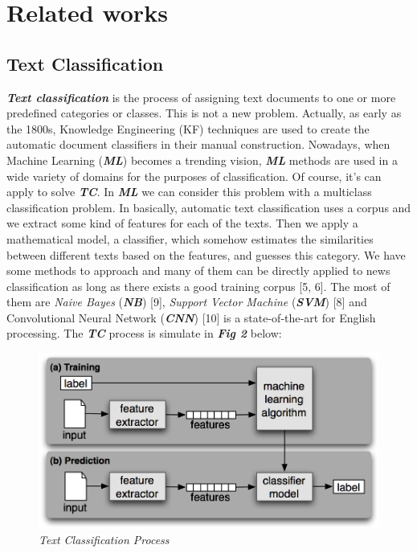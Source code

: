 \documentclass[conference]{IEEEtran}
\begin{document}
\section{Related works}
\subsection{Text Classification}
\textit{\textbf{Text classification}} is the process of assigning text documents to one or more predefined
categories or classes. This is not a new problem. Actually, as early as the 1800s, Knowledge Engineering (KF) techniques are used to create the automatic document
classifiers in their manual construction. Nowadays, when Machine Learning (\textbf{\textit{ML}}) becomes a trending vision, \textbf{\textit{ML}} methods are used in a wide variety of domains for the purposes of classification. Of course, it's can apply to solve \textbf{\textit{TC}}. In \textbf{\textit{ML}} we can consider this problem with a multiclass classification problem. In basically, automatic text classification uses a corpus and we extract some kind of features for each of the texts. Then we apply a mathematical model, a classifier, which somehow estimates the similarities between different texts based on the features, and guesses this category. We have some methods to approach and many of them can be directly applied to news classification as long as there exists a good
training corpus [5, 6]. The most of them are \textit{Naive Bayes} (\textbf{\textit{NB}}) [9], \textit{Support Vector Machine} (\textbf{\textit{SVM}}) [8] and Convolutional Neural Network (\textbf{\textit{CNN}}) [10] is a state-of-the-art for English processing. The \textit{\textbf{TC}} process is simulate in \textbf{\textit{Fig 2}} below:

\begin{figure}[h]
\includegraphics[scale=0.57]{workflow.png}
\centering
\caption{\textit{Text Classification Process}}
\end{figure}
\end{document}
